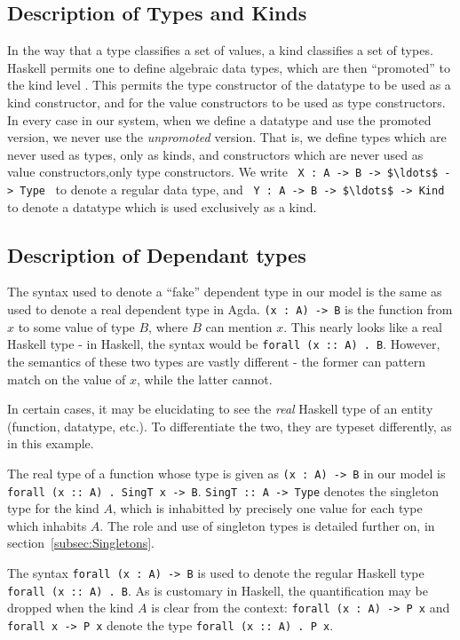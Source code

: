 \noindent
\subsection{Description of Types and Kinds}
In the way that a type classifies a set of values, a kind classifies a set of
types. Haskell permits one to define algebraic data types, which are then 
``promoted''
to the kind level \citep{promotion}. 
This permits the type constructor of the datatype to be used
as a kind constructor, and for the value constructors to be used as type 
constructors. In every case in our system, when we define a datatype and use 
the promoted version, we never use the \emph{unpromoted} version. That is, we 
define types which are never used as types, only as kinds, and constructors 
which are never used as value constructors,only type constructors. We write 
\,\,\,\lstinline!X : A -> B -> $\ldots$ -> Type!\,\,\, to denote
a regular data type, and \,\,\,\lstinline!Y : A -> B -> $\ldots$ -> Kind!\,\,\, 
to denote a datatype
which is used exclusively as a kind. 

\noindent
\subsection{Description of Dependant types}
The syntax used to denote a ``fake'' dependent type in our model is the same 
as used to denote a real dependent type in Agda. \lstinline!(x : A) -> B! is 
the function
from $x$ to some value of type $B$, where $B$ can mention $x$. This nearly 
looks like a 
real Haskell type - in Haskell, the syntax would be \texttt{forall (x :: A) . 
B}. However, 
the semantics of these two types are vastly different - the former can pattern 
match
on the value of $x$, while the latter cannot. 

In certain cases, it may be elucidating to see the \emph{real} Haskell type of
an entity (function, datatype, etc.). To differentiate the two, they are typeset
differently, as in this example.

The real type of a function whose type is given as \lstinline!(x : A) -> B! in
our model is \texttt{forall (x :: A) . SingT x -> B}. \texttt{SingT :: A -> 
Type}
denotes the singleton type for the kind $A$, which is inhabitted by precisely
one value for each type which inhabits $A$. The role and use of singleton types
is detailed further on, in section~\ref{subsec:Singletons}. 

The syntax \lstinline!forall (x : A) -> B! is used to denote the regular
Haskell type \texttt{forall (x :: A) . B}. As is customary in Haskell, the 
quantification
may be dropped when the kind $A$ is clear from the context: 
\lstinline!forall (x : A) -> P x! and
\lstinline!forall x -> P x! denote the type \texttt{forall (x :: A) . P x}.

